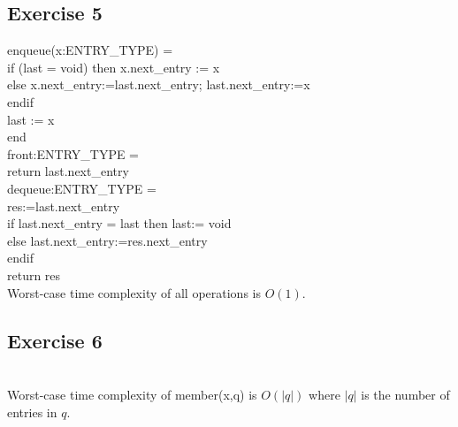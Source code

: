 \documentclass[english]{article}
\begin{document}
\subsection*{Exercise 5}

enqueue(x:ENTRY\_TYPE) = \\
if (last = void) then x.next\_entry := x \\
else x.next\_entry:=last.next\_entry;
last.next\_entry:=x \\
endif \\
last := x \\
end \\[6mm]
front:ENTRY\_TYPE = \\
return last.next\_entry \\[6mm]
dequeue:ENTRY\_TYPE = \\
res:=last.next\_entry \\
if last.next\_entry = last then last:= void \\
else last.next\_entry:=res.next\_entry \\
endif \\
return res \\[4mm]
Worst-case time complexity of all operations is $O(1)$.

\subsection*{Exercise 6}

\begin{algorithmic}
            \REPEAT 
            \ENDIF
   \ENDIF  
\end{algorithmic}

\mbox{}\\
Worst-case time complexity of member(x,q) is $O(|q|)$ where
$|q|$ is the number of entries in $q$.
\end{document}
